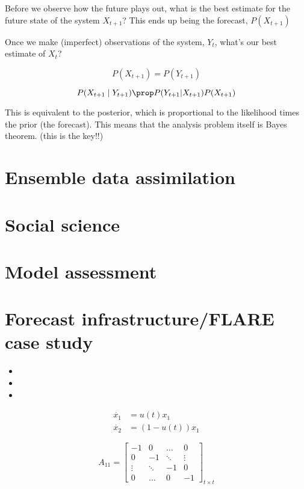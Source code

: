 \documentclass[12pt, oneside]{article}   	%
\begin{document}
Before we observe how the future plays out, what is the best estimate for the future state of the system $X_{t+1}$? This ends up being the forecast, $P(X_{t+1})$

Once we make (imperfect) observations of the system, $Y_t$, what's our best estimate of $X_t$?

$$P(X_{t+1}) = P(Y_{t+1}) $$

$$P(X_{t+1} \mid Y_{t+1}) \prop P(Y_{t+1} | X_{t+1}) P(X_{t+1}) $$

This is equivalent to the posterior, which is proportional to the likelihood times the prior (the forecast). This means that the analysis problem itself is Bayes theorem. (this is the key!!)


\section{Ensemble data assimilation}

\section{Social science}

\section{Model assessment}

\section{Forecast infrastructure/FLARE case study}


\begin{itemize}
\item 

\item 

\item 

\end{itemize}

\begin{align}
\dot{x_1} & = u(t) x_1 \nonumber \\
\dot{x_2} & = (1-u(t)) x_1 
\end{align}

\begin{equation}
A_{11}=
  \begin{bmatrix}
    -1		& 0 	 	& \ldots 	& 0  	 \\
    0 	 	& -1  	& \ddots 	& \vdots  \\
    \vdots   & \ddots 	& -1		& 0  \\
    0 		& \ldots 	& 0 		& -1  
  \end{bmatrix}_{ t \times t}
\end{equation}
\end{document}
